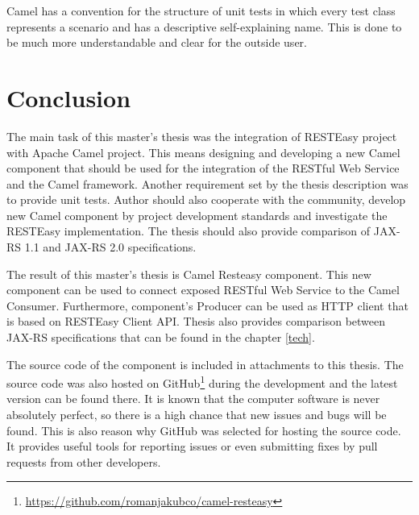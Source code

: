 \documentclass[12pt,final,oneside]{fithesis2}
\begin{document}
Camel has a convention for the structure of unit tests in which every test class represents a scenario and has a descriptive self-explaining name. This is done to be much more understandable and clear for the outside user. 


\chapter{Conclusion}
The main task of this master's thesis was the integration of RESTEasy project with Apache Camel project. This means designing and developing a new Camel component that should be used for the integration of the RESTful Web Service and the Camel framework. Another requirement set by the thesis description was to provide unit tests. Author should also cooperate with the community, develop new Camel component by project development standards and investigate the RESTEasy implementation. The thesis should also provide comparison of JAX-RS 1.1 and JAX-RS 2.0 specifications.

The result of this master's thesis is Camel Resteasy component. This new component can be used to connect exposed RESTful Web Service to the Camel Consumer. Furthermore, component's Producer can be used as HTTP client that is based on RESTEasy Client API. Thesis also provides comparison between JAX-RS specifications that can be found in the chapter \ref{tech}. 

The source code of the component is included in attachments to this thesis. The source code was also hosted on GitHub\footnote{\url{https://github.com/romanjakubco/camel-resteasy}} during the development and the latest version can be found there. It is known that the computer software is never absolutely perfect, so there is a high chance that new issues and bugs will be found. This is also reason why GitHub was selected for hosting the source code. It provides useful tools for reporting issues or even submitting fixes by pull requests from other developers.  
\end{document}
